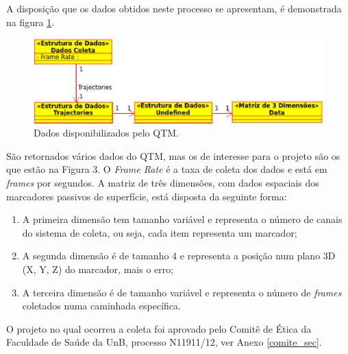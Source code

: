 A disposição que os dados obtidos neste processo se apresentam, é demonstrada na figura \ref{dados_coleta}.

\begin{figure}[ht]
	\centering
	\includegraphics[width=15cm]{figuras/dados_coleta.eps}
	\caption{Dados disponibilizados pelo QTM.}
	\label{dados_coleta}
\end{figure}

São retornados vários dados do QTM, mas os de interesse para o projeto são os que estão na Figura 3. 
O \emph{Frame Rate} é a taxa de coleta dos dados e está em \emph{frames} por segundos. 
A matriz de três dimensões, com dados espaciais dos marcadores passivos de superfície, está disposta da seguinte forma:
\begin{enumerate}
	\item A primeira dimensão tem tamanho variável e representa o número de canais do sistema de coleta, ou seja, cada item representa um marcador;
	\item A segunda dimensão é de tamanho 4 e representa a posição num plano 3D (X, Y, Z) do marcador, mais o erro;
	\item A terceira dimensão é de tamanho variável e representa o número de \emph{frames} coletados numa caminhada específica.
\end{enumerate}

O projeto no qual ocorreu a coleta foi aprovado
pelo Comitê de Ética da Faculdade de Saúde da UnB,
processo N11911/12, ver Anexo \ref{comite_sec}.
